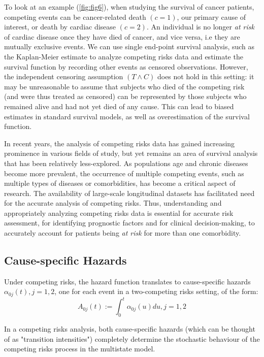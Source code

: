 To look at an example (\autoref{fig:fig6}), when studying the survival of cancer patients, competing events can be cancer-related death $(c = 1)$, our primary cause of interest, or death by cardiac disease $(c = 2)$. An individual is no longer \textit{at risk} of cardiac disease once they have died of cancer, and vice versa, i.e they are mutually exclusive events.
We can use single end-point survival analysis, such as the Kaplan-Meier estimate to analyze competing risks data and estimate the survival function by recording other events as censored observations. However, the independent censoring assumption $(T \wedge C)$ does not hold in this setting: it may be unreasonable to assume that subjects who died of the competing risk (and were thus treated as censored) can be represented by those subjects who remained alive and had not yet died of any cause.  This can lead to biased estimates in standard survival models, as well as overestimation of the survival function.
\smallskip \par 
In recent years, the analysis of competing risks data has gained increasing prominence in various fields of study, but yet remains an area of survival analysis that has been relatively less-explored. As populations age and chronic diseases become more prevalent, the occurrence of multiple competing events, such as multiple types of diseases or comorbidities, has become a critical aspect of research. The availability of large-scale longitudinal datasets has facilitated need for the accurate analysis of competing risks. Thus, understanding and appropriately analyzing competing risks data is essential for accurate risk assessment, for identifying prognostic factors and for clinical decision-making, to accurately account for patients being \textit{at risk} for more than one comorbidity.

\subsection{Cause-specific Hazards}

Under competing risks, the hazard function translates to cause-specific hazards $\alpha_{0j}(t), j = 1, 2$, one for each event in a two-competing risks setting, of the form: 
\begin{equation}
A_{0j}(t) := \int_{0}^{t} \alpha_{0j} (u) du, j = 1, 2
\end{equation}

In a competing risks analysis, both cause-specific hazards (which can be thought of as "transition intensities") completely determine the stochastic behaviour of the competing risks process in the multistate model.

